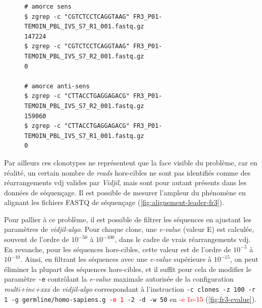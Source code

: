 \begin{figure}[H]
\begin{lstlisting}[language=custombash, 
caption={Commande Bash et résultat de la recherche des séquences des amorces dans les fichiers FASTQ R1 et R2.},
label={lst:bash-primer-r1-r2},
basicstyle=\ttfamily\small]
# amorce sens
$ zgrep -c "CGTCTCCTCAGGTAAG" FR3_P01-TEMOIN_PBL_IVS_S7_R1_001.fastq.gz
147224
$ zgrep -c "CGTCTCCTCAGGTAAG" FR3_P01-TEMOIN_PBL_IVS_S7_R2_001.fastq.gz
0

# amorce anti-sens
$ zgrep -c "CTTACCTGAGGAGACG" FR3_P01-TEMOIN_PBL_IVS_S7_R2_001.fastq.gz
159060
$ zgrep -c "CTTACCTGAGGAGACG" FR3_P01-TEMOIN_PBL_IVS_S7_R1_001.fastq.gz
0
\end{lstlisting}
\end{figure}

Par ailleurs ces clonotypes ne représentent que la face visible du problème,
car en réalité, un certain nombre de \textit{reads} hors-cibles ne sont pas
identifiés comme des réarrangements \gls{vdj} valides par \textit{Vidjil}, mais
sont pour autant présents dans les données de séquençage. Il est possible de
mesurer l'ampleur du phénomène en alignant les fichiers FASTQ de séquençage
(\autoref{fig:alignement-leader-fr3}).



Pour pallier à ce problème, il est possible de filtrer les séquences en
ajustant les paramètres de \textit{vidjil-algo}. Pour chaque clone, une
\textit{e-value} (valeur E) est calculée, souvent de l'ordre de $10^{-50}$ à
$10^{-100}$, dans le cadre de vrais réarrangements \gls{vdj}. En revanche, pour
les séquences hors-cibles, cette valeur est de l'ordre de $10^{-5}$ à
$10^{-10}$. Ainsi, en filtrant les séquences avec une \textit{e-value}
supérieure à $10^{-15}$, on peut éliminer la plupart des séquences hors-cibles,
et il suffit pour cela de modifier le paramètre \texttt{-e} contrôlant la
\textit{e-value} maximale autorisée de la configuration \textit{multi+inc+xxx}
de \textit{vidjil-algo} correspondant à l'instruction \texttt{-c clones -z 100
-r 1 -g germline/homo-sapiens.g \textcolor{red}{-e 1} -2 -d -w 50} en
\textcolor{red}{-e 1e-15} (\autoref{fig:fr3-evalue}).

